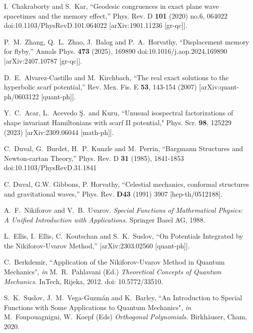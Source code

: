 \documentclass[preprint,showpacs,preprintnumbers,amsmath,amssymb,nofootinbib]{revtex4}
\begin{document}
\begin{thebibliography}{99}
I.~Chakraborty and S.~Kar,
``Geodesic congruences in exact plane wave spacetimes and the memory effect,''
Phys. Rev. D \textbf{101} (2020) no.6, 064022
doi:10.1103/PhysRevD.101.064022
[arXiv:1901.11236 [gr-qc]].

P.~M.~Zhang, Q.~L.~Zhao, J.~Balog and P.~A.~Horvathy,
``Displacement memory for flyby,''
Annals Phys. \textbf{473} (2025), 169890
doi:10.1016/j.aop.2024.169890
[arXiv:2407.10787 [gr-qc]].

D.~E.~Alvarez-Castillo and M.~Kirchbach,
``The real exact solutions to the hyperbolic scarf potential,''
Rev. Mex. Fis. E \textbf{53}, 143-154 (2007)
[arXiv:quant-ph/0603122 [quant-ph]].

Y.~C.~Acar, L.~Acevedo \c{S}.~and Kuru,
``Unusual isospectral factorizations of shape invariant Hamiltonians with scarf II potential," Phys. Scr. \textbf{98}, 125229 (2023)
[arXiv:2309.06044 [math-ph]].

C.~Duval, G.~Burdet, H.~P.~Kunzle and M.~Perrin,
``Bargmann Structures and Newton-cartan Theory,''
Phys. Rev. D \textbf{31} (1985), 1841-1853
doi:10.1103/PhysRevD.31.1841

C. Duval, G.W. Gibbons, P. Horvathy,
``Celestial mechanics, conformal structures and gravitational waves,''
 Phys. Rev. {\bf D43} (1991) 3907 %
[hep-th/0512188].

A.~F.~Nikiforov and V.~B.~Uvarov. {\sl Special Functions of Mathematical Physics: A Unified
Introduction with Applications.} Springer Basel AG, 1988.

L.~Ellis, I.~Ellis, C.~Koutschan and S.~K.~Suslov,
``On Potentials Integrated by the Nikiforov-Uvarov Method,''
[arXiv:2303.02560 [quant-ph]]. 

C.~Berkdemir, ``Application of the Nikiforov-Uvarov Method in Quantum Mechanics",
{\it in} M.~R.~Pahlavani (Ed.) {\sl Theoretical Concepts of Quantum Mechanics.} InTech, Rijeka, 2012. 
doi: 10.5772/33510.

S.~K.~Suslov, J.~M.~Vega-Guzm\'{a}n and K.~Barley, ``An Introduction to Special Functions with Some Applications to Quantum Mechanics", {\it in} M.~Foupouagnigni, W.~Koepf (Eds) {\sl Orthogonal Polynomials.} Birkh\"{a}user, Cham, 2020.


\end{thebibliography}
\end{document}
